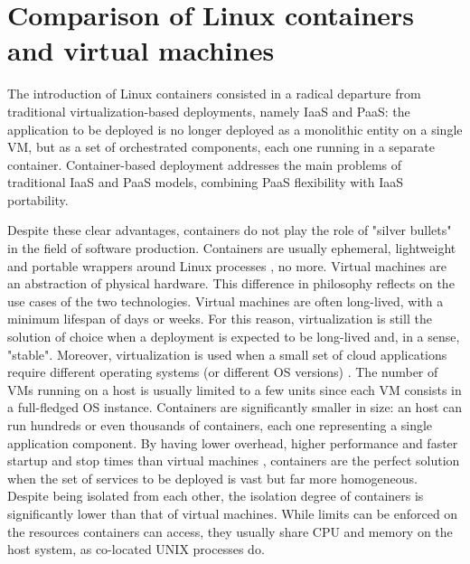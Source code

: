 \section{Comparison of Linux containers and virtual machines}
The introduction of Linux containers consisted in a radical departure from traditional virtualization-based deployments, namely IaaS and PaaS: the application to be deployed is no longer deployed as a monolithic entity on a single VM, but as a set of orchestrated components, each one running in a separate container. 
Container-based deployment addresses the main problems of traditional IaaS and PaaS models, combining PaaS flexibility with IaaS portability.

Despite these clear advantages, containers do not play the role of "silver bullets" in the field of software production. 
Containers are usually ephemeral, lightweight and portable wrappers around Linux processes \cite{kaneDockerRunningShipping2023}, 
no more. Virtual machines are an abstraction of physical hardware. 
This difference in philosophy reflects on the use cases of the two technologies. \newline
Virtual machines are often long-lived, with a minimum lifespan of days or weeks. 
For this reason, virtualization is still the solution of choice when a deployment is expected to be long-lived and, in a sense, "stable".
Moreover, virtualization is used when a small set of cloud applications require different operating systems (or different OS versions) \cite{bernstein2014containers}. 
The number of VMs running on a host is usually limited to a few units since each VM consists in a full-fledged OS instance.
Containers are significantly smaller in size: an host can run hundreds or even thousands of containers, each one representing a single application component.
By having lower overhead, higher performance and faster startup and stop times than virtual machines \cite{felter2015updated,chae2019performance}, containers are the perfect solution when the set of services to be deployed is vast but far more homogeneous.
Despite being isolated from each other, the isolation degree of containers is significantly lower than that of virtual machines. While limits can be enforced on the resources containers can access, they usually share CPU and memory on the host system, as co-located UNIX processes do. 

